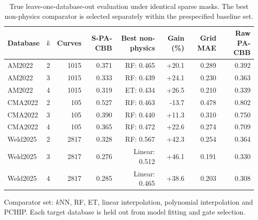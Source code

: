 \begin{table}[t]
\centering
\small
\setlength{\tabcolsep}{4.2pt}
\caption{True leave-one-database-out evaluation under identical sparse masks. The best non-physics comparator is selected separately within the prespecified baseline set.}
\label{tab:lodo_latest}
\begin{tabular}{llrrrrrr}
\toprule
Database & $k$ & Curves & S-PA-CBB & Best non-physics & Gain (\%) & Grid MAE & Raw PA-CBB \\
\midrule
AM2022 & 2 & 1015 & 0.371 & RF: 0.465 & +20.1 & 0.289 & 0.392 \\
AM2022 & 3 & 1015 & 0.333 & RF: 0.439 & +24.1 & 0.230 & 0.363 \\
AM2022 & 4 & 1015 & 0.319 & ET: 0.434 & +26.5 & 0.210 & 0.339 \\
CMA2022 & 2 & 105 & 0.527 & RF: 0.463 & -13.7 & 0.478 & 0.802 \\
CMA2022 & 3 & 105 & 0.390 & RF: 0.440 & +11.3 & 0.310 & 0.750 \\
CMA2022 & 4 & 105 & 0.365 & RF: 0.472 & +22.6 & 0.274 & 0.709 \\
Weld2025 & 2 & 2817 & 0.328 & RF: 0.567 & +42.3 & 0.254 & 0.364 \\
Weld2025 & 3 & 2817 & 0.276 & Linear: 0.512 & +46.1 & 0.191 & 0.330 \\
Weld2025 & 4 & 2817 & 0.285 & Linear: 0.465 & +38.6 & 0.203 & 0.308 \\
\bottomrule
\end{tabular}
\begin{minipage}{0.98\textwidth}\footnotesize Comparator set: $k$NN, RF, ET, linear interpolation, polynomial interpolation and PCHIP. Each target database is held out from model fitting and gate selection.\end{minipage}
\end{table}
